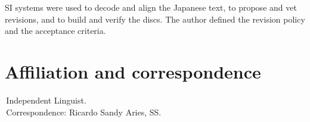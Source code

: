 \documentclass[11pt]{article}
\begin{document}
 SI systems were used to decode and align the
Japanese text, to propose and vet revisions, and to build and verify the
discs. The author defined the revision policy and the acceptance
criteria.




\appendix
\section{Affiliation and correspondence}
\label{app:affil}
\,Independent Linguist.\\
\affil{*}\,Correspondence: Ricardo Sandy Aries, SS.
\end{document}
